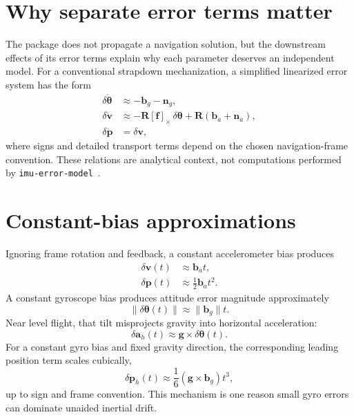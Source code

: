 \documentclass[11pt,oneside,headings=big]{scrreprt}
\newcommand{\skewmat}[1]{\left[#1\right]_{\times}}
\newcommand{\vect}[1]{\bm{#1}}
\newcommand{\mat}[1]{\bm{#1}}
\newcommand{\pkg}{\texttt{imu-error-model}}
\begin{document}
    \section{Why separate error terms matter}
    The package does not propagate a navigation solution, but the downstream effects
    of its error terms explain why each parameter deserves an independent model.
    For a conventional strapdown mechanization, a simplified linearized error system
    has the form
    \begin{align}
        \delta\dot{\vect\theta}
        &\approx-\vect b_g-\vect n_g,
        \label{eq:attitude-error-dynamics}\\
        \delta\dot{\vect v}
        &\approx-\mat R\skewmat{\vect f}\,\delta\vect\theta
        +\mat R(\vect b_a+\vect n_a),
        \label{eq:velocity-error-dynamics}\\
        \delta\dot{\vect p}&=\delta\vect v,
        \label{eq:position-error-dynamics}
    \end{align}
    where signs and detailed transport terms depend on the chosen navigation-frame
    convention. These relations are analytical context, not computations performed
    by \pkg{}~\cite{titterton2004,groves2013,woodman2007}.


    \section{Constant-bias approximations}
    Ignoring frame rotation and feedback, a constant accelerometer bias produces
    \begin{align}
        \delta\vect v(t)&\approx\vect b_a t,\\
        \delta\vect p(t)&\approx\frac12\vect b_a t^2.
        \label{eq:accel-bias-growth}
    \end{align}
    A constant gyroscope bias produces attitude error magnitude approximately
    \begin{equation}
        \lVert\delta\vect\theta(t)\rVert
        \approx\lVert\vect b_g\rVert t.
        \label{eq:gyro-bias-attitude}
    \end{equation}
    Near level flight, that tilt misprojects gravity into horizontal acceleration:
    \begin{equation}
        \delta\vect a_h(t)\approx\vect g\times\delta\vect\theta(t).
        \label{eq:tilt-gravity}
    \end{equation}
    For a constant gyro bias and fixed gravity direction, the corresponding leading
    position term scales cubically,
    \begin{equation}
        \delta\vect p_h(t)
        \approx\frac16\left(\vect g\times\vect b_g\right)t^3,
        \label{eq:gyro-bias-position}
    \end{equation}
    up to sign and frame convention. This mechanism is one reason small gyro errors
    can dominate unaided inertial drift.
\end{document}
